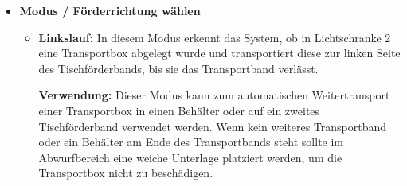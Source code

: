 \begin{itemize}
\begin{figure}[!ht]
\begin{center}
{
		}%
		\caption{Beispiel Anzeige im Hauptmenü}
		\label{fig:ViewportMain}
		\end{center}
	\end{figure}
	
	
	Wird der Modus gewechselt, so wird auf der Anzeige der gewählte Modus für einige Sekunden eingeblendet.
	Anschließend wechselt die Anzeige wieder in das Hauptmenü.
	  
	  
	  
	  
	\item \textbf{Modus / Förderrichtung wählen} \\  
		\begin{itemize}
		\item \textbf{Linkslauf:}
		In diesem Modus erkennt das System, ob in Lichtschranke 2 eine Transportbox abgelegt wurde und transportiert diese zur linken Seite des Tischförderbands, bis sie das Transportband verlässt.
		
		\textbf{Verwendung:}
		Dieser Modus kann zum automatischen Weitertransport einer Transportbox in einen Behälter oder auf ein zweites Tischförderband verwendet werden. Wenn kein weiteres Transportband oder ein Behälter am Ende des Transportbands steht sollte im Abwurfbereich eine weiche Unterlage platziert werden, um die Transportbox nicht zu beschädigen. 
		

\end{itemize}
\end{itemize}
